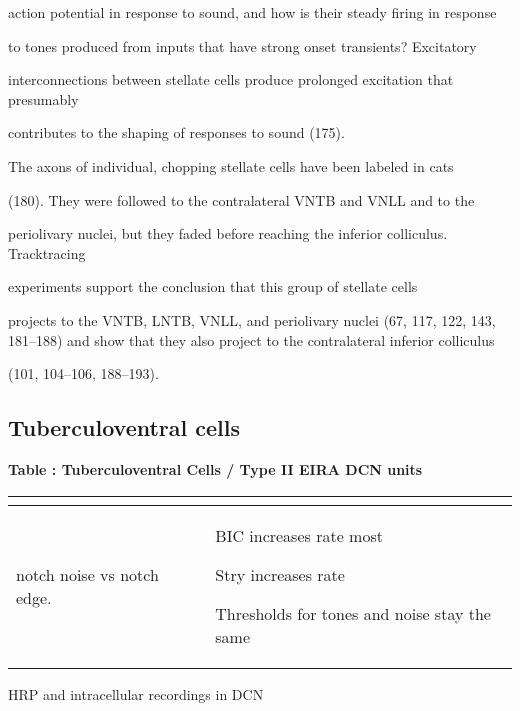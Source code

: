 \documentclass[10pt,a4paper]{article}
\begin{document}
action potential in response to sound, and how is their steady firing in
response

to tones produced from inputs that have strong onset transients?  Excitatory

interconnections between stellate cells produce prolonged excitation that
presumably

contributes to the shaping of responses to sound (175).

The axons of individual, chopping stellate cells have been labeled in cats

(180). They were followed to the contralateral VNTB and VNLL and to the

periolivary nuclei, but they faded before reaching the inferior
colliculus. Tracktracing

experiments support the conclusion that this group of stellate cells

projects to the VNTB, LNTB, VNLL, and periolivary nuclei (67, 117, 122, 143,
181--188) and show that they also project to the contralateral inferior
colliculus

(101, 104--106, 188--193).

\subsection{Tuberculoventral cells} 

{\bfseries Table : Tuberculoventral Cells / Type II EIRA DCN
  units}

\begin{flushleft}
  \tablehead{}
  \begin{supertabular}{|m{6.2770004cm}|m{6.2770004cm}|m{6.3120003cm}|}
    \hline
    \citep{EvansNelson:1973,WickesbergOertel:1990,WickesbergOertel:1993,WickesbergOertel:1988,WickesbergWhitlonEtAl:1991,Wickesberg:1996,YoungBrownell:1976,YoungVoigt:1981,ZhangOertel:1993}
    &
 
    \citep{RhodeGreenberg:1992,ShofnerYoung:1985,SpirouDavisEtAl:1999} &
 
    \citep{DavisYoung:2000}\\\hline
 \citep{ReissYoung:2005} notch noise vs notch
    edge.  &
 
    &
 
    BIC increases rate most

    Stry increases rate

    Thresholds for tones and noise stay the same\\\hline
  \end{supertabular}
\end{flushleft}
\citep{OertelWu:1989} HRP and intracellular recordings in DCN
\end{document}
